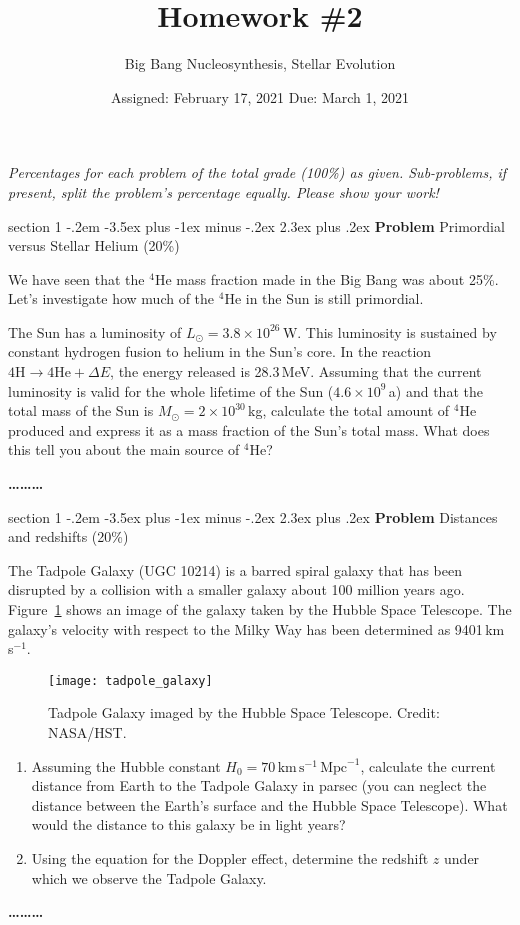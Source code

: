 \documentclass[letterpaper,12pt,twoside=false,DIV=11]{scrartcl}
\makeatletter
\newcommand{\topic}{\author}
\newenvironment{problem}{\@startsection
    {section}
    {1}
    {-.2em}
    {-3.5ex plus -1ex minus -.2ex}
    {2.3ex plus .2ex}
    {
        \pagebreak[3] %
        \noindent\sffamily\bfseries Problem
    }
}
{
    \begin{center}\large\bfseries\ldots\ldots\ldots\end{center}
}
\providecommand{\ex}[1]{\ensuremath{^{#1}}}
\makeatother
\begin{document}
\title{Homework \#2}
\topic{Big Bang Nucleosynthesis, Stellar Evolution}
\date{Assigned: February 17, 2021 \qquad Due: March 1, 2021}

\maketitle
\thispagestyle{fancy}


\noindent\emph{Percentages for each problem of the total grade (100\%) as given. Sub-problems, if present, split the problem's percentage equally. Please show your work!}

\begin{problem}{Primordial versus Stellar Helium (20\%)}

We have seen that the \ex{4}He mass fraction made in the Big Bang was about 25\%. Let's investigate how much of the \ex{4}He in the Sun is still primordial. 

The Sun has a luminosity of $L_\odot = 3.8\times 10^{26}$\,W. This luminosity is sustained by constant hydrogen fusion to helium in the Sun's core. In the reaction $4\mathrm{H} \longrightarrow 4\mathrm{He} + \Delta E$, the energy released is 28.3\,MeV. Assuming that the current luminosity is valid for the whole lifetime of the Sun ($4.6\times 10^{9}$\,a) and that the total mass of the Sun is $M_\odot = 2\times 10^{30}$\,kg, calculate the total amount of \ex{4}He produced and express it as a mass fraction of the Sun's total mass. What does this tell you about the main source of \ex{4}He?

\end{problem}

\begin{problem}{Distances and redshifts (20\%)}

The Tadpole Galaxy (UGC 10214) is a barred spiral galaxy that has been disrupted by a collision with a smaller galaxy about 100 million years ago. Figure~\ref{fig:tadpole_galaxy} shows an image of the galaxy taken by the Hubble Space Telescope. 
The galaxy's velocity with respect to the Milky Way has been determined as 9401\,km\,s$^{-1}$. 
\begin{figure}[tb]
    \centering
    \texttt{[image: tadpole\_galaxy]}
    \caption{Tadpole Galaxy imaged by the Hubble Space Telescope. Credit: NASA/HST.}
    \label{fig:tadpole_galaxy}
\end{figure}

\begin{enumerate}
    \item Assuming the Hubble constant $H_0 = 70\,\mathrm{km}\,\mathrm{s}^{-1}\,\mathrm{Mpc}^{-1}$, calculate the current distance from Earth to the Tadpole Galaxy in parsec (you can neglect the distance between the Earth's surface and the Hubble Space Telescope). What would the distance to this galaxy be in light years?
    \item Using the equation for the Doppler effect, determine the redshift $z$ under which we observe the Tadpole Galaxy.
\end{enumerate}

\end{problem}
\end{document}
